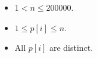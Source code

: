 \begin{itemize}
\tightlist
\item $1< n\le 200000$.
\item $1\le p[i] \le n$.
\item All $p[i]$ are distinct.
\end{itemize}

